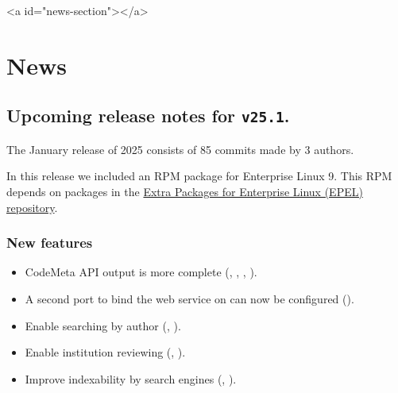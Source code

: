 \ifdefined\HCode
\begin{html}
<a id="news-section"></a>
\end{html}
\fi
\chapter*{News}

\section*{Upcoming release notes for \texttt{v25.1}.}

  The January release of 2025 consists of 85 commits made by 3 authors.

  In this release we included an RPM package for Enterprise Linux 9.  This RPM
  depends on packages in the \href{https://docs.fedoraproject.org/en-US/epel/}%
  {Extra Packages for Enterprise Linux (EPEL) repository}.

\subsection*{New features}
\begin{itemize}
  \item{CodeMeta API output is more complete
      (,
      ,
      ,
      ).}
  \item{A second port to bind the web service on can now be configured
      ().}
  \item{Enable searching by author (,
      ).}
  \item{Enable institution reviewing (,
      ).}
  \item{Improve indexability by search engines
      (,
      ).}
\end{itemize}
